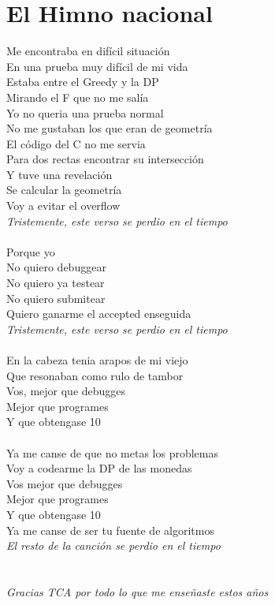 \documentclass[10pt, landscape, twocolumn, a4paper, notitlepage]{article}
\begin{document}
\section{El Himno nacional}
Me encontraba en dif\'icil situaci\'on\\
En una prueba muy dif\'icil de mi vida \\
Estaba entre el Greedy y la DP \\
Mirando el F que no me sal\'ia  \\
Yo no queria una prueba normal \\
No me gustaban los que eran de geometr\'ia \\
El c\'odigo del C no me servia \\
Para dos rectas encontrar su intersecci\'on \\
Y tuve una revelaci\'on \\
Se calcular la geometr\'ia \\
Voy a evitar el overflow \\
\textit{Tristemente, este verso se perdio en el tiempo} \\
\\
Porque yo \\
No quiero debuggear \\
No quiero ya testear \\
No quiero submitear \\
Quiero ganarme el accepted enseguida \\
\textit{Tristemente, este verso se perdio en el tiempo} \\
\\
En la cabeza tenia arapos de mi viejo \\
Que resonaban como rulo de tambor \\
Vos, mejor que debugges \\
Mejor que programes \\
Y que obtengase 10 \\
\\
Ya me canse de que no metas los problemas \\
Voy a codearme la DP de las monedas \\
Vos mejor que debugges \\
Mejor que programes \\
Y que obtengase 10 \\
Ya me canse de ser tu fuente de algoritmos \\
\textit{El resto de la canci\'on se perdio en el tiempo} \\
\\
\\
\textit{Gracias TCA por todo lo que me enseñaste estos años} \\
\end{document}
